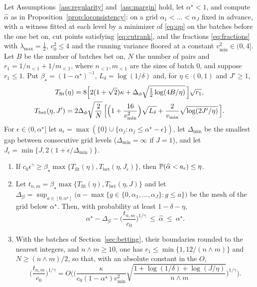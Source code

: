 \begin{theorem}
\label{thm:lorate}
Let Assumptions~\ref{ass:regularity} and~\ref{ass:margin} hold, let $\alpha^\star<1$, and compute
$\widehat\alpha$ as in Proposition~\ref{prop:loconsistency}: on a grid $\alpha_1<\dots<\alpha_J$ fixed in
advance, with a witness fitted at each level by a minimizer of \eqref{eq:qp} on the batches before the one bet on, cut
points satisfying \eqref{eq:cutrank}, and the fractions \eqref{eq:fractions} with $\lambda_{\max}=\tfrac12$,
$v_0^2\le4$ and the running variance floored at a constant $v^2_{\min}\in(0,4]$. Let $B$ be the number of
batches bet on, $N$ the number of pairs and $r_1=1/n_{<1}+1/m_{<1}$, where $n_{<1},m_{<1}$ are the sizes of batch $0$,
and suppose $r_1\le1$. Put $\beta_\star=(1-\alpha^\star)^{-1}$, $L_\delta=\log(1/\delta)$ and, for $\eta\in(0,1)$ and
$J'\ge1$,
\begin{gather}
T_{\mathrm{fit}}(\eta)=8\Big[2(1+\sqrt2)\kappa+\Delta_\phi\sqrt{\tfrac12\log(4B/\eta)}\,\Big]\sqrt{r_1},\notag\\
T_{\mathrm{bet}}(\eta,J')=2\Delta_\phi\sqrt{\frac2N}\,\Big[\Big(1+\frac{16}{v^2_{\min}}\Big)\sqrt{L_\delta}
+\frac2{v_{\min}}\sqrt{\log(2J'/\eta)}\,\Big].
\label{eq:loconst}
\end{gather}
For $\epsilon\in(0,\alpha^\star]$ let $a_\epsilon=\max(\{0\}\cup\{\alpha_j:\alpha_j\le\alpha^\star-\epsilon\})$, let
$\Delta_{\min}$ be the smallest gap between consecutive grid levels ($\Delta_{\min}=\infty$ if $J=1$), and let
$J_\epsilon=\min\{J,2(1+\epsilon/\Delta_{\min})\}$.
\begin{enumerate}[label=(\roman*),leftmargin=*]
\item If $c_0\epsilon^\gamma\ge\beta_\star\max\{T_{\mathrm{fit}}(\eta),T_{\mathrm{bet}}(\eta,J_\epsilon)\}$, then
$\mathbb{P}(\widehat\alpha<a_\epsilon)\le\eta$.
\item Let $t_{n,m}=\beta_\star\max\{T_{\mathrm{fit}}(\eta),T_{\mathrm{bet}}(\eta,J)\}$ and let
$\Delta_{\mathcal G}=\sup_{a\in[0,\alpha^\star]}\big(a-\max\{g\in\{0,\alpha_1,\dots,\alpha_J\}:g\le a\}\big)$ be the mesh of the grid
below $\alpha^\star$. Then, with probability at least $1-\delta-\eta$,
\[
\alpha^\star-\Delta_{\mathcal G}-\Big(\frac{t_{n,m}}{c_0}\Big)^{1/\gamma}\ \le\ \widehat\alpha\ \le\ \alpha^\star .
\]
\item With the batches of Section~\ref{sec:betting}, their boundaries rounded to the nearest integers, and
$n\wedge m\ge10$, one has $r_1\le\min\{1,12/(n\wedge m)\}$ and $N\ge(n\wedge m)/2$, so that, with an absolute
constant in the $O$,
\[
\Big(\frac{t_{n,m}}{c_0}\Big)^{1/\gamma}
=O\bigg(\bigg(\frac{\kappa}{c_0(1-\alpha^\star)v^2_{\min}}
\sqrt{\frac{1+\log(1/\delta)+\log(J/\eta)}{n\wedge m}}\bigg)^{1/\gamma}\bigg).
\]
\end{enumerate}
\end{theorem}

